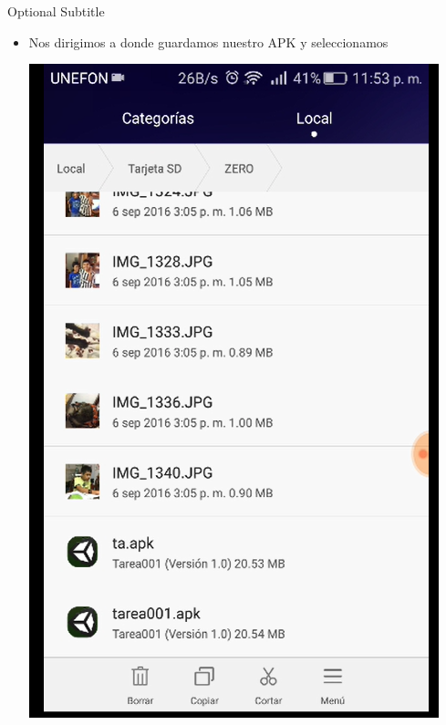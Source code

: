 \documentclass{beamer}
\begin{document}
\begin{frame}{36}{Optional Subtitle}
  \begin{itemize}
  \item {
    Nos dirigimos a donde guardamos nuestro APK y seleccionamos
  }
  
  \includegraphics[height=0.7\paperheight]{image/IU36}
  \centering
  \end{itemize}
\end{frame}
\end{document}
